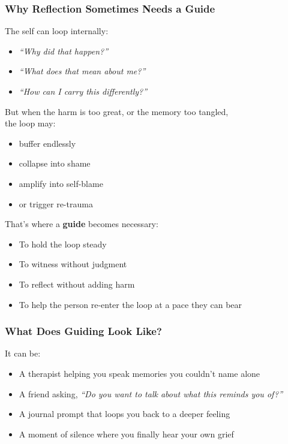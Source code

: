 \subsubsection{\texorpdfstring{\textbf{Why Reflection Sometimes Needs
a
Guide}}{Why Reflection Sometimes Needs a Guide}}\label{why-reflection-sometimes-needs-a-guide}

The self can loop internally:

\begin{itemize}
\item
  \emph{``Why did that happen?''\\
  }
\item
  \emph{``What does that mean about me?''\\
  }
\item
  \emph{``How can I carry this differently?''\\
  }
\end{itemize}

But when the harm is too great, or the memory too tangled,\\
the loop may:

\begin{itemize}
\item
  buffer endlessly
\item
  collapse into shame
\item
  amplify into self-blame
\item
  or trigger re-trauma
\end{itemize}

That's where a \textbf{guide} becomes necessary:

\begin{itemize}
\item
  To hold the loop steady
\item
  To witness without judgment
\item
  To reflect without adding harm
\item
  To help the person re-enter the loop at a pace they can bear
\end{itemize}

\subsubsection{\texorpdfstring{\textbf{What Does Guiding Look
Like?}}{What Does Guiding Look Like?}}\label{what-does-guiding-look-like}

It can be:

\begin{itemize}
\item
  A therapist helping you speak memories you couldn't name alone
\item
  A friend asking, \emph{``Do you want to talk about what this reminds
  you of?''\\
  }
\item
  A journal prompt that loops you back to a deeper feeling
\item
  A moment of silence where you finally hear your own grief
\end{itemize}


